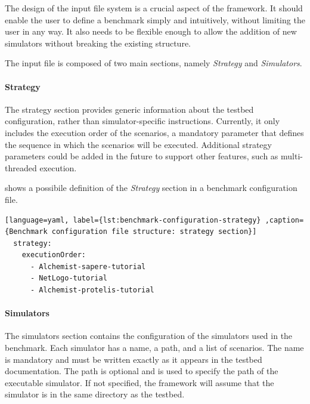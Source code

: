 \documentclass[12pt,a4paper,openright,twoside]{book}
\begin{document}
The design of the input file system is a crucial aspect of the framework.
It should enable the user to define a benchmark simply and intuitively, without limiting the user in any way.
It also needs to be flexible enough to allow the addition of new simulators without breaking the existing structure.

The input file is composed of two main sections, namely \emph{Strategy} and \emph{Simulators}.

\paragraph*{Strategy}
The strategy section provides generic information about the testbed configuration, rather than simulator-specific instructions.
Currently, it only includes the execution order of the scenarios, a mandatory parameter that defines the sequence in which the scenarios will be executed.
Additional strategy parameters could be added in the future to support other features, such as multi-threaded execution.

 shows a possibile definition of the \emph{Strategy} section in a benchmark configuration file.

\begin{lstlisting}[language=yaml, label={lst:benchmark-configuration-strategy} ,caption={Benchmark configuration file structure: strategy section}]
  strategy:
    executionOrder:
      - Alchemist-sapere-tutorial
      - NetLogo-tutorial
      - Alchemist-protelis-tutorial
\end{lstlisting}

\paragraph*{Simulators}
The simulators section contains the configuration of the simulators used in the benchmark.
Each simulator has a name, a path, and a list of scenarios.
The name is mandatory and must be written exactly as it appears in the testbed documentation.
The path is optional and is used to specify the path of the executable simulator.
If not specified, the framework will assume that the simulator is in the same directory as the testbed.
\end{document}

